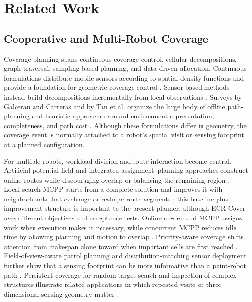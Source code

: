 \section{Related Work}\label{sec:related}

\subsection{Cooperative and Multi-Robot Coverage}

Coverage planning spans continuous coverage control, cellular decompositions, graph traversal, sampling-based planning, and data-driven allocation. Continuous formulations distribute mobile sensors according to spatial density functions and provide a foundation for geometric coverage control \cite{cortes2004coverage}. Sensor-based methods instead build decompositions incrementally from local observations \cite{acar2002sensor}. Surveys by Galceran and Carreras and by Tan et al. organize the large body of offline path-planning and heuristic approaches around environment representation, completeness, and path cost \cite{galceran2013survey,tan2021review}. Although these formulations differ in geometry, the coverage event is normally attached to a robot's spatial visit or sensing footprint at a planned configuration.

For multiple robots, workload division and route interaction become central. Artificial-potential-field and integrated assignment--planning approaches construct online routes while discouraging overlap or balancing the remaining region \cite{wang2024apfcpp,wang2025macplanner}. Local-search MCPP starts from a complete solution and improves it with neighborhoods that exchange or reshape route segments \cite{tang2024local}; this baseline-plus-improvement structure is important to the present planner, although ECR-Cover uses different objectives and acceptance tests. Online on-demand MCPP assigns work when execution makes it necessary, while concurrent MCPP reduces idle time by allowing planning and motion to overlap \cite{mitra2024ondemand,mitra2025concurrent}. Priority-aware coverage shifts attention from makespan alone toward when important cells are first reached \cite{lee2026priority}. Field-of-view-aware patrol planning and distribution-matching sensor deployment further show that a sensing footprint can be more informative than a point-robot path \cite{zuo2026fom,ghimire2024stein}. Persistent coverage for random-target search and inspection of complex structures illustrate related applications in which repeated visits or three-dimensional sensing geometry matter \cite{li2025persistent,jing2020multiuav}.

